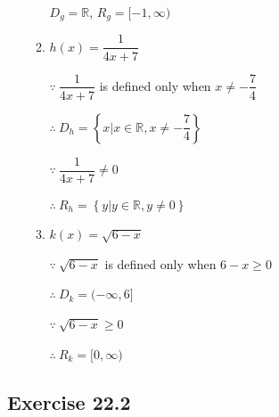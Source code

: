 \documentclass[12pt]{report}
\begin{document}
\begin{enumerate}
\begin{multicols}{2}
\begin{enumerate}
                  $D_g = \mathbb{R}$, $R_g = [-1, \infty)$

            \item $h(x) = \dfrac{1}{4x + 7}$
                  \sol{}

                  $\because\ \dfrac{1}{4x + 7}$ is defined only when $x \neq -\dfrac{7}{4}$

                  $\therefore\ D_h = \left\{x \vert x \in \mathbb{R}, x \neq -\dfrac{7}{4}\right\}$

                  $\because\ \dfrac{1}{4x + 7} \neq 0$

                  $\therefore\ R_h = \left\{y \vert y \in \mathbb{R}, y \neq 0\right\}$

            \item $k(x) = \sqrt{6 - x}$
                  \sol{}

                  $\because\ \sqrt{6 - x}$ is defined only when $6 - x \geq 0$

                  $\therefore\ D_k = (-\infty, 6]$

                  $\because\ \sqrt{6 - x} \geq 0$

                  $\therefore\ R_k = [0, \infty)$
          \end{enumerate}
        \end{multicols}
\end{enumerate}

\newpage

\subsection*{Exercise 22.2}
\end{document}
